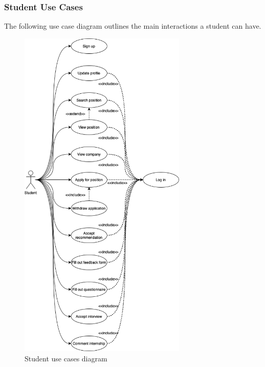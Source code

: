 
\clearpage
\subsubsection{Student Use Cases}
The following use case diagram outlines the main interactions a student can have.

\begin{figure}[h]
    \centering
    \includegraphics[width=8cm]{images/use-case-diagrams/student.png}
    \caption{Student use cases diagram}
\end{figure}

